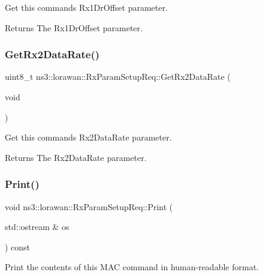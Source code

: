 Get this command\textquotesingle{}s Rx1\+Dr\+Offset parameter.

\begin{DoxyReturn}{Returns}
The Rx1\+Dr\+Offset parameter. 
\end{DoxyReturn}
\mbox{\label{classns3_1_1lorawan_1_1RxParamSetupReq_a89462a466ee10c28f4ded25b6b3b9dda}} 
\subsubsection{\texorpdfstring{Get\+Rx2\+Data\+Rate()}{GetRx2DataRate()}}
{\footnotesize\ttfamily uint8\+\_\+t ns3\+::lorawan\+::\+Rx\+Param\+Setup\+Req\+::\+Get\+Rx2\+Data\+Rate (\begin{DoxyParamCaption}\item[{void}]{ }\end{DoxyParamCaption})}

Get this command\textquotesingle{}s Rx2\+Data\+Rate parameter.

\begin{DoxyReturn}{Returns}
The Rx2\+Data\+Rate parameter. 
\end{DoxyReturn}
\mbox{\label{classns3_1_1lorawan_1_1RxParamSetupReq_a92e0695decb4f9d8ba29bcb83168c386}} 
\subsubsection{\texorpdfstring{Print()}{Print()}}
{\footnotesize\ttfamily void ns3\+::lorawan\+::\+Rx\+Param\+Setup\+Req\+::\+Print (\begin{DoxyParamCaption}\item[{std\+::ostream \&}]{os }\end{DoxyParamCaption}) const\hspace{0.3cm}{\ttfamily [virtual]}}

Print the contents of this M\+AC command in human-\/readable format.


